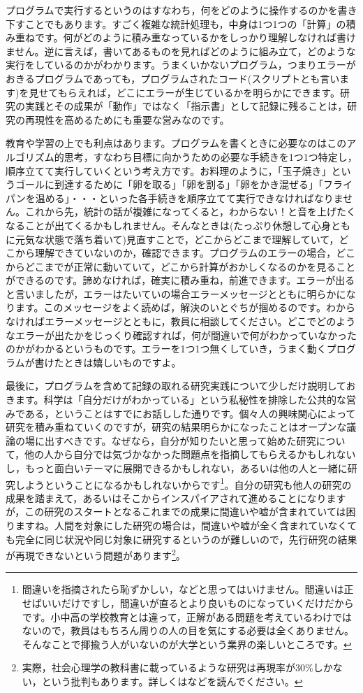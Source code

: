 \documentclass{ltjsbook}
\begin{document}
プログラムで実行するというのはすなわち，何をどのように操作するのかを書き下すことでもあります。すごく複雑な統計処理も，中身は1つ1つの「計算」の積み重ねです。何がどのように積み重なっているかをしっかり理解しなければ書けません。逆に言えば，書いてあるものを見ればどのように組み立て，どのような実行をしているのかがわかります。うまくいかないプログラム，つまりエラーがおきるプログラムであっても，プログラムされたコード(スクリプトとも言います)を見せてもらえれば，どこにエラーが生じているかを明らかにできます。研究の実践とその成果が「動作」ではなく「指示書」として記録に残ることは，研究の再現性を高めるためにも重要な営みなのです。

教育や学習の上でも利点はあります。プログラムを書くときに必要なのはこのアルゴリズム的思考，すなわち目標に向かうための必要な手続きを1つ1つ特定し，順序立てて実行していくという考え方です。お料理のように，「玉子焼き」というゴールに到達するために「卵を取る」「卵を割る」「卵をかき混ぜる」「フライパンを温める」・・・といった各手続きを順序立てて実行できなければなりません。これから先，統計の話が複雑になってくると，わからない！と音を上げたくなることが出てくるかもしれません。そんなときは(たっぷり休憩して心身ともに元気な状態で落ち着いて)見直すことで，どこからどこまで理解していて，どこから理解できていないのか，確認できます。プログラムのエラーの場合，どこからどこまでが正常に動いていて，どこから計算がおかしくなるのかを見ることができるのです。諦めなければ，確実に積み重ね，前進できます。エラーが出ると言いましたが，エラーはたいていの場合エラーメッセージとともに明らかになります。このメッセージをよく読めば，解決のいとぐちが掴めるのです。わからなければエラーメッセージとともに，教員に相談してください。どこでどのようなエラーが出たかをじっくり確認すれば，何が間違いで何がわかっていなかったのかがわかるというものです。エラーを1つ1つ無くしていき，うまく動くプログラムが書けたときは嬉しいものですよ。

最後に，プログラムを含めて記録の取れる研究実践について少しだけ説明しておきます。科学は「自分だけがわかっている」という私秘性を排除した公共的な営みである，ということはすでにお話しした通りです。個々人の興味関心によって研究を積み重ねていくのですが，研究の結果明らかになったことはオープンな議論の場に出すべきです。なぜなら，自分が知りたいと思って始めた研究について，他の人から自分では気づかなかった問題点を指摘してもらえるかもしれないし，もっと面白いテーマに展開できるかもしれない，あるいは他の人と一緒に研究しようということになるかもしれないからです\footnote{間違いを指摘されたら恥ずかしい，などと思ってはいけません。間違いは正せばいいだけですし，間違いが直るとより良いものになっていくだけだからです。小中高の学校教育とは違って，正解がある問題を考えているわけではないので，教員はもちろん周りの人の目を気にする必要は全くありません。そんなことで揶揄う人がいないのが大学という業界の楽しいところです。}。自分の研究も他人の研究の成果を踏まえて，あるいはそこからインスパイアされて進めることになりますが，この研究のスタートとなるこれまでの成果に間違いや嘘が含まれていては困りますね。人間を対象にした研究の場合は，間違いや嘘が全く含まれていなくても完全に同じ状況や同じ対象に研究するというのが難しいので，先行研究の結果が再現できないという問題があります\footnote{実際，社会心理学の教科書に載っているような研究は再現率が30\%しかない，という批判もあります。詳しくは\citet{池田2016}などを読んでください。}。
\end{document}
